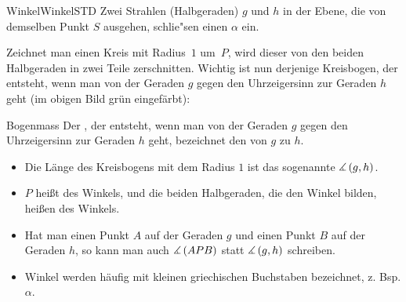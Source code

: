 \begin{MXContent}{Winkel}{Winkel}{STD}
Zwei Strahlen (Halbgeraden) $g$ und $h$ in der Ebene, die von demselben Punkt 
$S$ ausgehen, schlie"sen einen  $\alpha$ ein.

\begin{center}
\end{center}

Zeichnet man einen Kreis mit Radius~$1$ um~$P$, wird dieser von den beiden Halbgeraden in zwei Teile zerschnitten. Wichtig ist nun derjenige Kreisbogen, der entsteht, wenn man von der Geraden $g$ gegen den Uhrzeigersinn zur Geraden $h$ geht (im obigen Bild gr\"un eingef\"arbt):

\begin{MXInfo}{Bogenmass}%
Der , der entsteht, wenn man von der Geraden $g$ gegen den Uhrzeigersinn zur Geraden $h$ geht, bezeichnet den  von $g$ zu $h$.
  \begin{itemize}
    \item Die L\"ange des Kreisbogens mit dem Radius $1$ ist das sogenannte  $\measuredangle \left( g, h \right)$.
    \item $P$ hei\ss t  des Winkels, und die beiden Halbgeraden, die den Winkel bilden, hei\ss en  des Winkels.
    \item Hat man einen Punkt $A$ auf der Geraden $g$ und einen Punkt $B$ auf der Geraden $h$, so kann man auch $\measuredangle \left( A P B \right)$ statt $\measuredangle \left( g, h \right)$ schreiben.
    \item Winkel werden h\"aufig mit kleinen griechischen Buchstaben bezeichnet, z. Bsp. $\alpha$.
  \end{itemize}
\end{MXInfo}


\end{MXContent}
